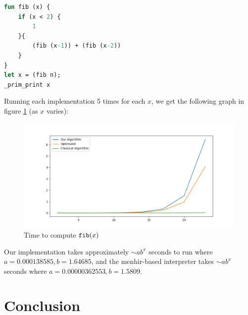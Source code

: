 \documentclass{llncs}
\begin{document}
\begin{lstlisting}[language=Caml, frame=single]
fun fib (x) {
    if (x < 2) {
        1
    }{
        (fib (x-1)) + (fib (x-2))
    }
}
let x = (fib n);
_prim_print x
\end{lstlisting}

\noindent Running each implementation 5 times for each $x$, we get the following graph in figure \ref{fig:fib} (as $x$ varies):

\begin{figure}

    \centerline{\includegraphics[width=\hsize]{../Docs/Images/fib.png}}
    \caption{Time to compute $\hbox{\tt fib}(x)$}
    \label{fig:fib}

\end{figure}

Our implementation takes approximately $\sim ab^x$ seconds to run where $a=0.000138585, b=1.64685$, and the menhir-based interpreter takes $\sim ab^x$ seconds where $a=0.00000362553, b=1.5809$.

\section{Conclusion}
\end{document}
